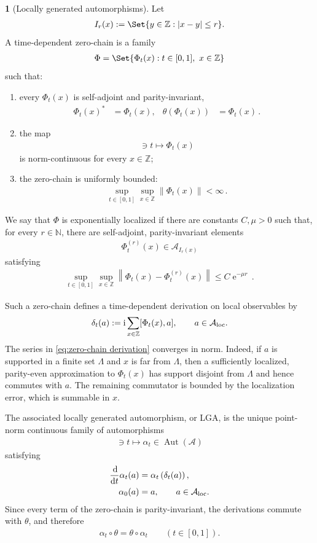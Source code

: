 \documentclass[a4paper,10pt]{article}
\numberwithin{equation}{section}
\theoremstyle{plain}
\theoremstyle{plain}
\theoremstyle{plain}
\theoremstyle{plain}
\theoremstyle{plain}
\theoremstyle{remark}
\theoremstyle{definition}
\newtheorem{defn}[defn]{\protect\definitionname}
\providecommand{\definitionname}{Definition}
\newcommand{\ee}{\operatorname{e}}
\newcommand{\ii}{\operatorname{i}}
\newcommand{\ZZ}{\mathbb{Z}}
\newcommand{\NN}{\mathbb{N}}
\newcommand{\calA}{\mathcal{A}}
\newcommand{\Automorphisms}[1]{\operatorname{Aut}(#1)}
\newcommand\norm[1]{\left\lVert#1\right\rVert}
\newcommand{\dif}{\operatorname{d}\!} %
\newcommand{\eq}[1]{\begin{align*}#1\end{align*}}
\newcommand{\eql}[1]{\begin{align}#1\end{align}}
\newcommand{\br}[1]{\left(#1\right)}
\begin{document}
\begin{defn}[Locally generated automorphisms]
Let
\eq{
    I_r(x)
    :=
    \Set{
        y\in\ZZ:
        |x-y|\leq r
    }.
}
A time-dependent zero-chain is a family
\eq{
    \Phi
    =
    \Set{
        \Phi_t(x):
        t\in[0,1],\
        x\in\ZZ
    }
}
such that:
\begin{enumerate}
    \item every $\Phi_t(x)$ is self-adjoint and parity-invariant,
    \eq{
        \Phi_t(x)^*
        &=
        \Phi_t(x),&
        \theta\br{\Phi_t(x)}
        &=
        \Phi_t(x)\,.
    }
    \item the map
    \eq{
        [0,1]\ni t
        \longmapsto
        \Phi_t(x)
    }
    is norm-continuous for every $x\in\ZZ$;
    \item the zero-chain is uniformly bounded:
    \eq{
        \sup_{t\in[0,1]}
        \sup_{x\in\ZZ}
        \norm{\Phi_t(x)}
        <
        \infty\,.
    }
\end{enumerate}

We say that $\Phi$ is exponentially localized if there are constants
$C,\mu>0$ such that, for every $r\in\NN$, there are self-adjoint,
parity-invariant elements
\eq{
    \Phi_t^{(r)}(x)
    \in
    \calA_{I_r(x)}
}
satisfying
\eq{
    \sup_{t\in[0,1]}
    \sup_{x\in\ZZ}
    \norm{
        \Phi_t(x)-\Phi_t^{(r)}(x)
    }
    \leq
    C\ee^{-\mu r}\,.
}

Such a zero-chain defines a time-dependent derivation on local observables
by
\eql{\label{eq:zero-chain derivation}
    \delta_t(a)
    :=
    \ii
    \sum_{x\in\ZZ}
    [\Phi_t(x),a],
    \qquad
    a\in\calA_{\rm loc}.
}
The series in \cref{eq:zero-chain derivation} converges in norm. Indeed,
if $a$ is supported in a finite set $\Lambda$ and $x$ is far from
$\Lambda$, then a sufficiently localized, parity-even approximation to
$\Phi_t(x)$ has support disjoint from $\Lambda$ and hence commutes with
$a$. The remaining commutator is bounded by the localization error, which
is summable in $x$.

The associated locally generated automorphism, or LGA, is the unique
point-norm continuous family of automorphisms
\eq{
    [0,1]\ni t
    \longmapsto
    \alpha_t\in\Automorphisms{\calA}
}
satisfying
\eq{
    \frac{\dif}{\dif t}\alpha_t(a)
    &=
    \alpha_t\br{\delta_t(a)},\\
    \alpha_0(a)
    &=
    a,
    \qquad
    a\in\calA_{\rm loc}.
}
Since every term of the zero-chain is parity-invariant, the derivations
commute with $\theta$, and therefore
\eq{
    \alpha_t\circ\theta
    =
    \theta\circ\alpha_t
    \qquad
    \br{
        t\in[0,1]
    }.
}
\end{defn}
\end{document}
